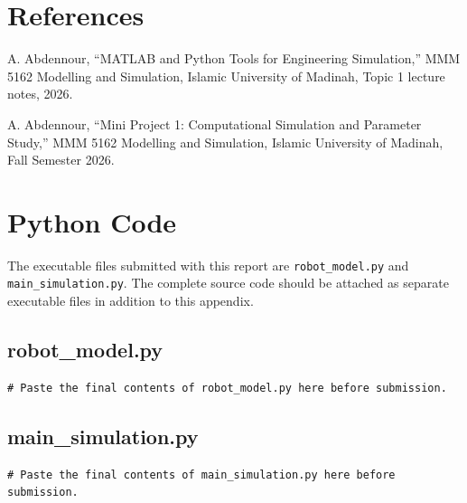\documentclass[12pt,a4paper]{article}
\begin{document}
\section*{References}

\begin{enumerate}[label={[\arabic*]},leftmargin=1.1cm,itemsep=3pt]
\item A. Abdennour, ``MATLAB and Python Tools for Engineering Simulation,'' MMM 5162 Modelling and Simulation, Islamic University of Madinah, Topic 1 lecture notes, 2026.

\item A. Abdennour, ``Mini Project 1: Computational Simulation and Parameter Study,'' MMM 5162 Modelling and Simulation, Islamic University of Madinah, Fall Semester 2026.
\end{enumerate}

\clearpage
\appendix
\section{Python Code}

The executable files submitted with this report are \texttt{robot\_model.py} and \texttt{main\_simulation.py}. The complete source code should be attached as separate executable files in addition to this appendix.

\subsection{robot\_model.py}

\begin{verbatim}
# Paste the final contents of robot_model.py here before submission.
\end{verbatim}

\subsection{main\_simulation.py}

\begin{verbatim}
# Paste the final contents of main_simulation.py here before submission.
\end{verbatim}
\end{document}
